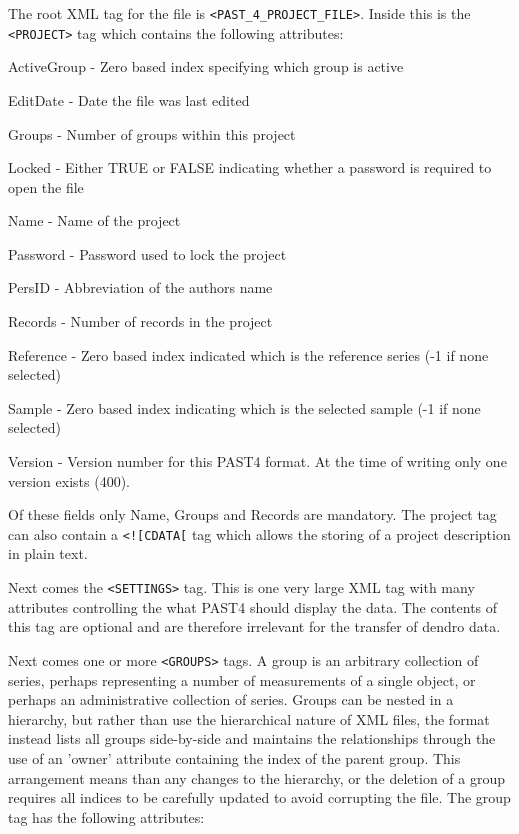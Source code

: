 The root XML tag for the file is \verb|<PAST_4_PROJECT_FILE>|. Inside this is the \verb|<PROJECT>| tag which contains the following attributes:

\begin{itemize*}
    \item  ActiveGroup - Zero based index specifying which group is active
    \item  EditDate - Date the file was last edited
    \item  Groups - Number of groups within this project
    \item  Locked - Either TRUE or FALSE indicating whether a password is required to open the file
    \item  Name - Name of the project
    \item  Password - Password used to lock the project
    \item  PersID - Abbreviation of the authors name
    \item  Records - Number of records in the project
    \item  Reference - Zero based index indicated which is the reference series (-1 if none selected)
    \item  Sample - Zero based index indicating which is the selected sample (-1 if none selected)
    \item  Version - Version number for this PAST4 format. At the time of writing only one version exists (400). 
\end{itemize*}

Of these fields only Name, Groups and Records are mandatory. The project tag can also contain a \verb|<![CDATA[| tag which allows the storing of a project description in plain text.

Next comes the \verb|<SETTINGS>| tag. This is one very large XML tag with many attributes controlling the what PAST4 should display the data. The contents of this tag are optional and are therefore irrelevant for the transfer of dendro data.

Next comes one or more \verb|<GROUPS>| tags. A group is an arbitrary collection of series, perhaps representing a number of measurements of a single object, or perhaps an administrative collection of series. Groups can be nested in a hierarchy, but rather than use the hierarchical nature of XML files, the format instead lists all groups side-by-side and maintains the relationships through the use of an 'owner' attribute containing the index of the parent group. This arrangement means than any changes to the hierarchy, or the deletion of a group requires all indices to be carefully updated to avoid corrupting the file. The group tag has the following attributes:

